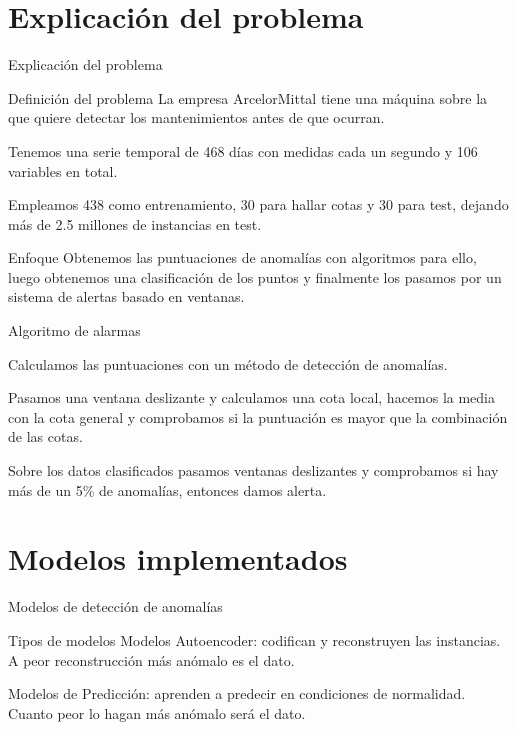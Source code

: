 \documentclass[10pt]{beamer}
\begin{document}
\section{Explicación del problema}

\begin{frame}[fragile]{Explicación del problema}
	\vspace{10px}
	\pause
	
	\begin{block}{Definición del problema}
		La empresa ArcelorMittal tiene una máquina sobre la que quiere detectar los mantenimientos antes de que ocurran.
		
		Tenemos una serie temporal de 468 días con medidas cada un segundo y 106 variables en total.
		
		Empleamos 438 como entrenamiento, 30 para hallar cotas y 30 para test, dejando más de 2.5 millones de instancias en test.
	\end{block}

	\begin{exampleblock}{Enfoque}
		Obtenemos las puntuaciones de anomalías con algoritmos para ello, luego obtenemos una clasificación de los puntos y finalmente los pasamos por un sistema de alertas basado en ventanas.
	\end{exampleblock}
	
\end{frame}

\begin{frame}[fragile]{Algoritmo de alarmas}
	\vspace{10px}
	\pause
	
	Calculamos las puntuaciones con un método de detección de anomalías.
	
	Pasamos una ventana deslizante y calculamos una cota local, hacemos la media con la cota general y comprobamos si la puntuación es mayor que la combinación de las cotas.
	
	Sobre los datos clasificados pasamos ventanas deslizantes y comprobamos si hay más de un 5\% de anomalías, entonces damos alerta.
	
\end{frame}

\section{Modelos implementados}

\begin{frame}[fragile]{Modelos de detección de anomalías}
	\vspace{10px}
	\pause
	
	\begin{block}{Tipos de modelos}
		Modelos Autoencoder: codifican y reconstruyen las instancias. A peor reconstrucción más anómalo es el dato.
		
		Modelos de Predicción: aprenden a predecir en condiciones de normalidad. Cuanto peor lo hagan más anómalo será el dato.
	\end{block}
	
\end{frame}
\end{document}
